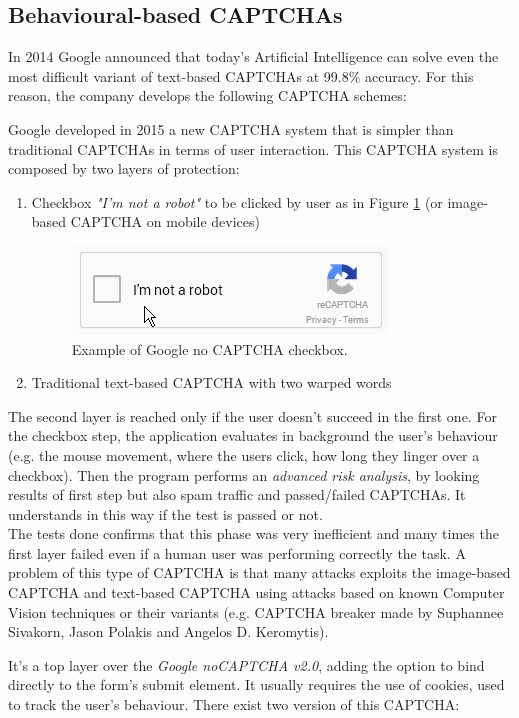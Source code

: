 \subsection{Behavioural-based CAPTCHAs}
In 2014 Google announced that today’s Artificial Intelligence can solve even the most difficult variant of text-based CAPTCHAs at 99.8\% accuracy\cite{break_text}. For this reason, the company develops the following CAPTCHA schemes:
\begin{itemize}
{Google developed in 2015 a new CAPTCHA system that is simpler than traditional CAPTCHAs in terms of user interaction\cite{google}. This CAPTCHA system is composed by two layers of protection:
\begin{enumerate}
\item{Checkbox \textit{"I'm not a robot"} to be clicked by user as in Figure \ref{soa:noCAPTCHA} (or image-based CAPTCHA on mobile devices)
\begin{figure}[h]
     \centering
     \includegraphics[width=.4\linewidth]{Images/StateOfArt/noCAPTCHA}
     \caption{\footnotesize{Example of Google no CAPTCHA checkbox.}}\label{soa:noCAPTCHA}
\end{figure}
}
\item{Traditional text-based CAPTCHA with two warped words}
\end{enumerate}
The second layer is reached only if the user doesn't succeed in the first one. For the checkbox step, the application evaluates in background the user's behaviour (e.g. the mouse movement, where the users click, how long they linger over a checkbox). Then the program performs an \textit{advanced risk analysis}, by looking results of first step but also spam traffic and passed/failed CAPTCHAs. It understands in this way if the test is passed or not.\\
The tests done confirms that this phase was very inefficient and many times the first layer failed even if a human user was performing correctly the task. A problem of this type of CAPTCHA is that many attacks exploits the image-based CAPTCHA and text-based CAPTCHA using attacks based on known Computer Vision techniques or their variants (e.g. CAPTCHA breaker made by Suphannee Sivakorn, Jason Polakis and Angelos D. Keromytis\cite{break_google}).
}
{It's a top layer over the \textit{Google noCAPTCHA v2.0}, adding the option to bind directly to the form's submit element\cite{google}. It usually requires the use of cookies, used to track the user's behaviour. There exist two version of this CAPTCHA:
}
\end{itemize}
